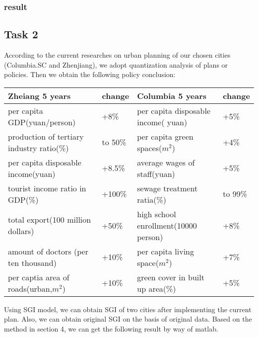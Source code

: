 \documentclass{mcmthesis}
\begin{document}
\subsubsection{result}


\subsection{Task 2}%

According to the current researches on urban planning of our chosen cities (Columbia.SC and Zhenjiang), we adopt quantization analysis of plans or policies. Then we obtain the following policy conclusion:\\
\begin{table}[h]

\centering
{}
\begin{tabular}{p{5.2cm}|p{1.2cm}|p{5.2cm}|p{1.2cm}}
\hline
\bf Zheiang 5 years	 & \bf change	 & \bf Columbia 5 years	& \bf change \\
\hline
 per capita GDP(yuan/person)	& +8\%	& per capita disposable income( yuan)	& +5\% \\
production of tertiary industry ratio(\%)	& to 50\%	& per capita green spaces($m^2$)	& +4\% \\
per capita disposable income(yuan)	& +8.5\%	& average wages of staff(yuan)	& +5\% \\
tourist income ratio in GDP(\%)	& +100\%	& sewage treatment ratia(\%)	& to 99\% \\
total export(100 million dollars)	& +50\%	& high school enrollment(10000 person)	& +8\% \\
amount of doctors (per ten thousand)	& +10\%	& per capita living space($m^2$)	& +7\% \\
per captia area of roads(urban,$m^2$)	& +10\%	& green cover in built up area(\%)	& +5\% \\
\hline
\end{tabular}
\end{table}

\noindent Using SGI model, we can obtain SGI of two cities after implementing the current plan. Also, we can obtain original SGI on the basis of original data. Based on the method in section 4, we can get the following result by way of matlab.\\
\end{document}
